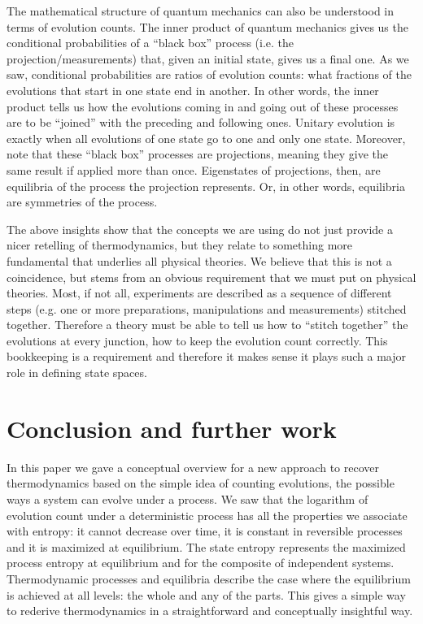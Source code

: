 \documentclass[letterpaper,twocolumn]{article}
\begin{document}
The mathematical structure of quantum mechanics can also be understood in terms of evolution counts. The inner product of quantum mechanics gives us the conditional probabilities of a ``black box'' process (i.e. the projection/measurements) that, given an initial state, gives us a final one. As we saw, conditional probabilities are ratios of evolution counts: what fractions of the evolutions that start in one state end in another. In other words, the inner product tells us how the evolutions coming in and going out of these processes are to be ``joined'' with the preceding and following ones.  Unitary evolution is exactly when all evolutions of one state go to one and only one state.  Moreover, note that these ``black box'' processes are projections, meaning they give the same result if applied more than once. Eigenstates of projections, then, are equilibria of the process the projection represents. Or, in other words, equilibria are symmetries of the process.

The above insights show that the concepts we are using do not just provide a nicer retelling of thermodynamics, but they relate to something more fundamental that underlies all physical theories. We believe that this is not a coincidence, but stems from an obvious requirement that we must put on physical theories. Most, if not all, experiments are described as a sequence of different steps (e.g. one or more preparations, manipulations and measurements) stitched together. Therefore a theory must be able to tell us how to ``stitch together'' the evolutions at every junction, how to keep the evolution count correctly. This bookkeeping is a requirement and therefore it makes sense it plays such a major role in defining state spaces.

\section{Conclusion and further work}

In this paper we gave a conceptual overview for a new approach to recover thermodynamics based on the simple idea of counting evolutions, the possible ways a system can evolve under a process. We saw that the logarithm of evolution count under a deterministic process has all the properties we associate with entropy: it cannot decrease over time, it is constant in reversible processes and it is maximized at equilibrium. The state entropy represents the maximized process entropy at equilibrium and for the composite of independent systems. Thermodynamic processes and equilibria describe the case where the equilibrium is achieved at all levels: the whole and any of the parts. This gives a simple way to rederive thermodynamics in a straightforward and conceptually insightful way.
\end{document}
